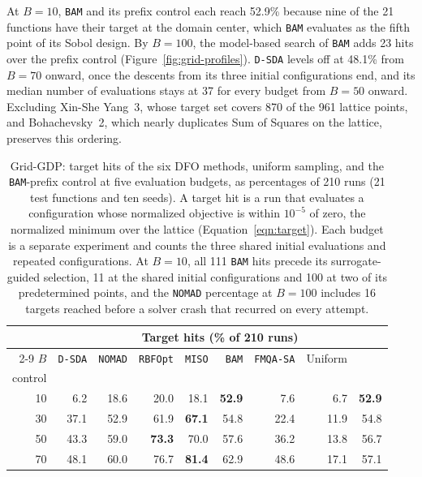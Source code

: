 \documentclass{article}
\begin{document}
At \(B=10\), \texttt{BAM} and its prefix control each reach 52.9\% because nine of the 21 functions have their target at the domain center, which \texttt{BAM} evaluates as the fifth point of its Sobol design.
By \(B=100\), the model-based search of \texttt{BAM} adds 23 hits over the prefix control (Figure~\ref{fig:grid-profiles}).
\texttt{D-SDA} levels off at 48.1\% from \(B=70\) onward, once the descents from its three initial configurations end, and its median number of evaluations stays at 37 for every budget from \(B=50\) onward.
Excluding Xin-She Yang~3, whose target set covers 870 of the 961 lattice points, and Bohachevsky~2, which nearly duplicates Sum of Squares on the lattice, preserves this ordering.
\begin{table}[htbp]
\centering
\caption{Grid-GDP: target hits of the six DFO methods, uniform sampling, and the \texttt{BAM}-prefix control at five evaluation budgets, as percentages of 210 runs (21 test functions and ten seeds).
A target hit is a run that evaluates a configuration whose normalized objective is within \(10^{-5}\) of zero, the normalized minimum over the lattice (Equation~\eqref{eqn:target}).
Each budget is a separate experiment and counts the three shared initial evaluations and repeated configurations.
At \(B=10\), all 111 \texttt{BAM} hits precede its surrogate-guided selection, 11 at the shared initial configurations and 100 at two of its predetermined points, and the \texttt{NOMAD} percentage at \(B=100\) includes 16 targets reached before a solver crash that recurred on every attempt.}
\label{tab:grid-hits}
\footnotesize
\setlength{\tabcolsep}{3.5pt}
\begin{threeparttable}
\begin{tabular}{@{}rrrrrrrrr@{}}\toprule
 & \multicolumn{8}{c}{Target hits (\% of 210 runs)}\\\cmidrule(l){2-9}
\(B\) & \texttt{D-SDA} & \texttt{NOMAD} & \texttt{RBFOpt} & \texttt{MISO} & \texttt{BAM} & \texttt{FMQA-SA} & Uniform & \makecell{\texttt{BAM}-prefix\\control}\\\midrule
10 & 6.2 & 18.6 & 20.0 & 18.1 & \textbf{52.9} & 7.6 & 6.7 & \textbf{52.9} \\
30 & 37.1 & 52.9 & 61.9 & \textbf{67.1} & 54.8 & 22.4 & 11.9 & 54.8 \\
50 & 43.3 & 59.0 & \textbf{73.3} & 70.0 & 57.6 & 36.2 & 13.8 & 56.7 \\
70 & 48.1 & 60.0 & 76.7 & \textbf{81.4} & 62.9 & 48.6 & 17.1 & 57.1 \\

\end{tabular}
\end{threeparttable}
\end{table}
\end{document}
